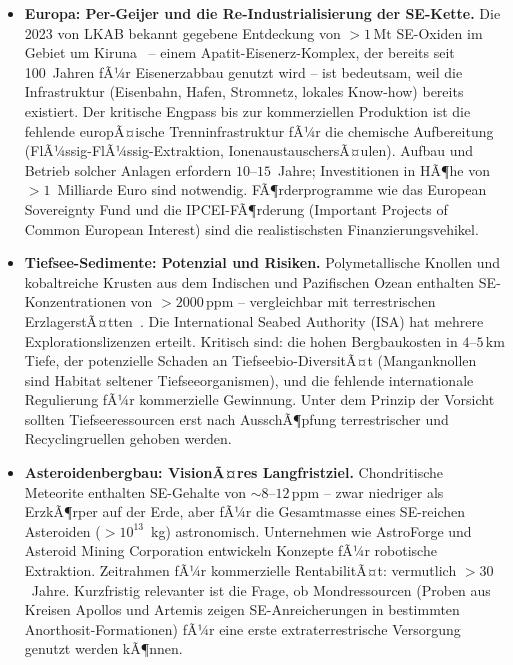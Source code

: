 ﻿\documentclass[12pt, a4paper]{report}
\theoremstyle{definition}
\theoremstyle{remark}
\begin{document}
\begin{itemize}
  \item \textbf{Europa: Per-Geijer und die Re-Industrialisierung der
        SE-Kette.}
    Die 2023 von LKAB bekannt gegebene Entdeckung von $>1\,\text{Mt}$
    SE-Oxiden im Gebiet um Kiruna~\cite{lkab2023} -- einem Apatit-Eisenerz-Komplex,
    der bereits seit 100~Jahren fÃ¼r Eisenerzabbau genutzt wird -- ist bedeutsam,
    weil die Infrastruktur (Eisenbahn, Hafen, Stromnetz, lokales Know-how)
    bereits existiert. Der kritische Engpass bis zur kommerziellen Produktion
    ist die fehlende europÃ¤ische Trenninfrastruktur fÃ¼r die chemische
    Aufbereitung (FlÃ¼ssig-FlÃ¼ssig-Extraktion, IonenaustauschersÃ¤ulen). Aufbau
    und Betrieb solcher Anlagen erfordern $10$--$15$~Jahre; Investitionen in
    HÃ¶he von $> 1$~Milliarde Euro sind notwendig. FÃ¶rderprogramme wie das
    European Sovereignty Fund und die IPCEI-FÃ¶rderung (Important Projects of
    Common European Interest) sind die realistischsten Finanzierungsvehikel.

  \item \textbf{Tiefsee-Sedimente: Potenzial und Risiken.}
    Polymetallische Knollen und kobaltreiche Krusten aus dem Indischen und
    Pazifischen Ozean enthalten SE-Konzentrationen von $>2000\,\text{ppm}$
    -- vergleichbar mit terrestrischen ErzlagerstÃ¤tten~\cite{balaram2019}.
    Die International Seabed Authority (ISA) hat mehrere Explorationslizenzen
    erteilt. Kritisch sind: die hohen Bergbaukosten in $4$--$5\,\text{km}$
    Tiefe, der potenzielle Schaden an Tiefseebio-DiversitÃ¤t (Manganknollen
    sind Habitat seltener Tiefseeorganismen), und die fehlende internationale
    Regulierung fÃ¼r kommerzielle Gewinnung. Unter dem Prinzip der Vorsicht
    sollten Tiefseeressourcen erst nach AusschÃ¶pfung terrestrischer und
    Recyclingruellen gehoben werden.

  \item \textbf{Asteroidenbergbau: VisionÃ¤res Langfristziel.}
    Chondritische Meteorite enthalten SE-Gehalte von $\sim 8$--$12\,\text{ppm}$
    -- zwar niedriger als ErzkÃ¶rper auf der Erde, aber fÃ¼r die
    Gesamtmasse eines SE-reichen Asteroiden ($>10^{13}$~kg) astronomisch.
    Unternehmen wie AstroForge und Asteroid Mining Corporation entwickeln
    Konzepte fÃ¼r robotische Extraktion. Zeitrahmen fÃ¼r kommerzielle
    RentabilitÃ¤t: vermutlich $>30$~Jahre. Kurzfristig relevanter ist die
    Frage, ob Mondressourcen (Proben aus Kreisen Apollos und Artemis zeigen
    SE-Anreicherungen in bestimmten Anorthosit-Formationen) fÃ¼r eine erste
    extraterrestrische Versorgung genutzt werden kÃ¶nnen.
\end{itemize}
\end{document}
